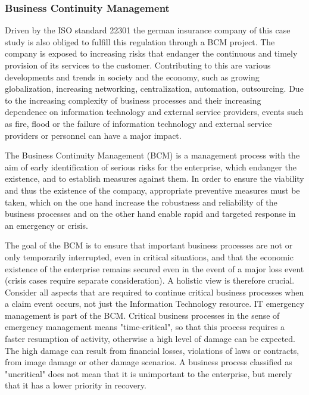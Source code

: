 \subsubsection{Business Continuity Management}

Driven by the ISO standard 22301 the german insurance company of this case study is also obliged to fulfill this regulation through a BCM project. The company is exposed to increasing risks that endanger the continuous and timely provision of its services to the customer. Contributing to this are various developments and trends in society and the economy, such as growing globalization, increasing networking, centralization, automation, outsourcing.
Due to the increasing complexity of business processes and their increasing dependence on information technology and external service providers, events such as fire, flood or the failure of information technology and external service providers or personnel can have a major impact.

The Business Continuity Management (BCM) is a management process with the aim of early identification of serious risks for the enterprise, which endanger the existence, and to establish measures against them. In order to ensure the viability and thus the existence of the company, appropriate preventive measures must be taken, which on the one hand increase the robustness and reliability of the business processes and on the other hand enable rapid and targeted response in an emergency or crisis.

The goal of the BCM is to ensure that important business processes are not or only temporarily interrupted, even in critical situations, and that the economic existence of the enterprise remains secured even in the event of a major loss event (crisis cases require separate consideration). A holistic view is therefore crucial. Consider all aspects that are required to continue critical business processes when a claim event occurs, not just the Information Technology resource. IT emergency management is part of the BCM.
Critical business processes in the sense of emergency management means "time-critical", so that this process requires a faster resumption of activity, otherwise a high level of damage can be expected. The high damage can result from financial losses, violations of laws or contracts, from image damage or other damage scenarios.
A business process classified as "uncritical" does not mean that it is unimportant to the enterprise, but merely that it has a lower priority in recovery.

